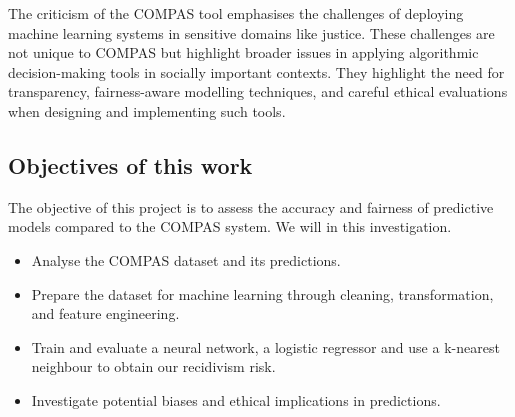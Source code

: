 The criticism of the COMPAS tool emphasises the challenges of deploying machine learning systems in sensitive domains like justice. These challenges are not unique to COMPAS but highlight broader issues in applying algorithmic decision-making tools in socially important contexts. They highlight the need for transparency, fairness-aware modelling techniques, and careful ethical evaluations when designing and implementing such tools.

\subsection{Objectives of this work}

The objective of this project is to assess the accuracy and fairness of predictive models compared to the COMPAS system. We will in this investigation.

\begin{itemize}[]
	\item Analyse the COMPAS dataset and its predictions.
	\item Prepare the dataset for machine learning through cleaning, transformation, and feature engineering.
	\item Train and evaluate a neural network, a logistic regressor and use a k-nearest neighbour to obtain our recidivism risk.
	\item Investigate potential biases and ethical implications in predictions.
\end{itemize}